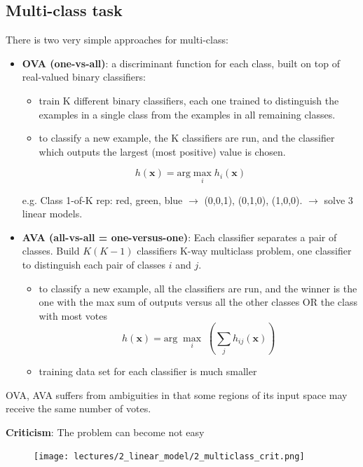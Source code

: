 \documentclass[../main.tex]{subfiles}
\begin{document}
\subsection{Multi-class task}
There is two very simple approaches for multi-class:

\begin{itemize}
    \item \textbf{OVA (one-vs-all)}: a discriminant function for each class, built on top of real-valued binary classifiers:
    \begin{itemize}
        \item train K different binary classifiers, each one trained to distinguish the examples in a single class from the examples in all remaining classes.
        \item to classify a new example, the K classifiers are run, and the classifier which outputs the largest (most positive) value is chosen.
    \end{itemize}
        $$ h(\mathbf{x}) = \mbox{arg}\max_{i}h_i(\mathbf{x})$$ 

    e.g. Class 1-of-K rep: {red, green, blue} $\rightarrow$ (0,0,1), (0,1,0), (1,0,0). $\rightarrow$ solve 3 linear models.
    
    \item \textbf{AVA (all-vs-all = one-versus-one)}:
    Each classifier separates a pair of classes. Build $K(K-1)$ classifiers K-way multiclass problem, one classifier to distinguish each pair of classes $i$ and $j$.
    \begin{itemize}
        \item to classify a new example, all the classifiers are run, and the winner is the one with the
                max sum of outputs versus all the other classes OR the class with most votes
        $$ h(\mathbf{x}) = \mbox{arg}\;\max_{i} \; (\sum_{j}^{} h_{ij}(\mathbf{x}))$$ 
        \item training data set for each classifier is much smaller
    \end{itemize}
    
\end{itemize}
OVA, AVA suffers from ambiguities in that some regions of its input space may receive the same number of votes.

\noindent \textbf{Criticism}:
The problem can become not easy
\begin{figure}[H]
    \centering
    \texttt{[image: lectures/2\_linear\_model/2\_multiclass\_crit.png]}
\end{figure}
\end{document}

